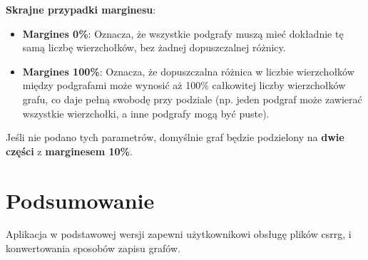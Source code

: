 \documentclass[a4paper,12pt]{article}
\begin{document}
\textbf{Skrajne przypadki marginesu}:
\begin{itemize}
    \item \textbf{Margines 0\%}: Oznacza, że wszystkie podgrafy muszą mieć dokładnie tę samą liczbę wierzchołków, bez żadnej dopuszczalnej różnicy.
    \item \textbf{Margines 100\%}: Oznacza, że dopuszczalna różnica w liczbie wierzchołków między podgrafami może wynosić aż 100\% całkowitej liczby wierzchołków grafu, co daje pełną swobodę przy podziale (np. jeden podgraf może zawierać wszystkie wierzchołki, a inne podgrafy mogą być puste).
\end{itemize}

Jeśli nie podano tych parametrów, domyślnie graf będzie podzielony na \textbf{dwie części} z \textbf{marginesem 10\%}.

\section{Podsumowanie}
Aplikacja w podstawowej wersji zapewni użytkownikowi obsługę plików csrrg, i konwertowania sposobów zapisu grafów.
\end{document}
